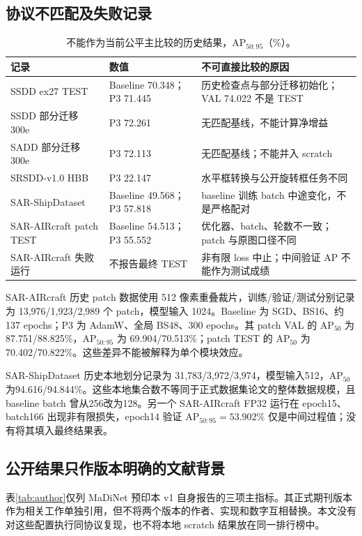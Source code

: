 \documentclass[UTF8,11pt,a4paper,fontset=fandol]{ctexart}
\newcommand{\ap}{\mathrm{AP}}
\begin{document}
\subsection{协议不匹配及失败记录}
\begin{table}[H]\centering\small
\caption{不能作为当前公平主比较的历史结果，$\ap_{50:95}$（\%）。}
\begin{tabularx}{\linewidth}{P{3.35cm}P{2.7cm}Y}
\toprule
记录 & 数值 & 不可直接比较的原因\\
\midrule
SSDD ex27 TEST & Baseline 70.348；P3 71.445 & 历史检查点与部分迁移初始化；VAL 74.022 不是 TEST\\
SSDD 部分迁移 300e & P3 72.261 & 无匹配基线，不能计算净增益\\
SADD 部分迁移 300e & P3 72.113 & 无匹配基线；不能并入 scratch\\
SRSDD-v1.0 HBB & P3 22.147 & 水平框转换与公开旋转框任务不同\\
SAR-ShipDataset & Baseline 49.568；P3 57.818 & baseline 训练 batch 中途变化，不是严格配对\\
SAR-AIRcraft patch TEST & Baseline 54.513；P3 55.552 & 优化器、batch、轮数不一致；patch 与原图口径不同\\
SAR-AIRcraft 失败运行 & 不报告最终 TEST & 非有限 loss 中止；中间验证 AP 不能作为测试成绩\\
\bottomrule
\end{tabularx}
\end{table}

SAR-AIRcraft 历史 patch 数据使用 512 像素重叠裁片，训练/验证/测试分别记录为 13,976/1,923/2,989 个 patch，模型输入 1024。Baseline 为 SGD、BS16、约137 epochs；P3 为 AdamW、全局 BS48、300 epochs。其 patch VAL 的 $\ap_{50}$ 为 87.751/88.825\%，$\ap_{50:95}$ 为 69.904/70.513\%；patch TEST 的 $\ap_{50}$ 为 70.402/70.822\%。这些差异不能被解释为单个模块效应。

SAR-ShipDataset 历史本地划分记录为 31,783/3,972/3,974，模型输入512，$\ap_{50}$ 为94.616/94.844\%。这些本地集合数不等同于正式数据集论文的整体数据规模，且 baseline batch 曾从256改为128。另一个 SAR-AIRcraft FP32 运行在 epoch15、batch166 出现非有限损失，epoch14 验证 $\ap_{50:95}=53.902\%$ 仅是中间过程值；没有将其填入最终结果表。

\subsection{公开结果只作版本明确的文献背景}
表\ref{tab:author}仅列 MaDiNet 预印本 v1 自身报告的三项主指标\cite{madinet2024v1}。其正式期刊版本作为相关工作单独引用\cite{madinet2025}，但不将两个版本的作者、实现和数字互相替换。本文没有对这些配置执行同协议复现，也不将本地 scratch 结果放在同一排行榜中。
\end{document}
